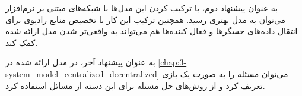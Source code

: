     به عنوان پیشنهاد دوم، با ترکیب کردن این مدل‌ها با شبکه‌های مبتنی بر نرم‌افزار می‌توان به مدل بهتری رسید.
    همچنین ترکیب این کار با تخصیص منابع رادیوی برای انتقال داده‌های حسگر‌ها و فعال کننده‌ها هم می‌تواند به واقعی‌تر شدن مدل ارائه شده کمک کند.

    به عنوان پیشنهاد آخر، در مدل ارائه شده در \cref{chap:3-system_model_centralized_decentralized} می‌توان مسئله را به صورت یک بازی تعریف کرد و از روش‌های حل مسئله برای این دسته از مسائل استفاده کرد. 